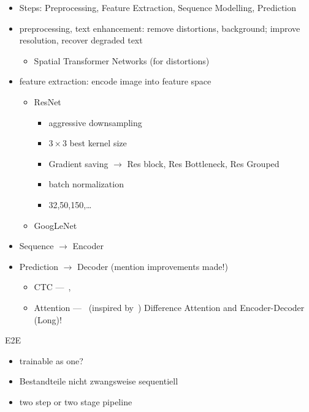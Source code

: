 \begin{itemize}
    \item Steps: Preprocessing, Feature Extraction, Sequence Modelling, Prediction
    \item preprocessing, text enhancement: remove distortions, background; improve resolution,
        recover degraded text
        \begin{itemize}
            \item Spatial Transformer Networks (for distortions)
        \end{itemize}
    \item feature extraction: encode image into feature space
        \begin{itemize}
            \item ResNet
                \begin{itemize}
                    \item aggressive downsampling
                    \item $3\times3$ best kernel size
                    \item Gradient saving $\rightarrow$ Res block, Res Bottleneck, Res Grouped
                    \item batch normalization
                    \item 32,50,150,\ldots
                \end{itemize}
            \item GoogLeNet
        \end{itemize}
    \item Sequence $\rightarrow$ Encoder
    \item Prediction $\rightarrow$ Decoder (mention improvements made!)
        \begin{itemize}
            \item CTC ---~\cite{shi_end--end_2017}, \\
            \item Attention ---~\cite{ghosh_visual_2017} (inspired
                by~\cite{bahdanau_neural_2016,xu_show_2016})
                Difference Attention and Encoder-Decoder (Long)!
        \end{itemize}
\end{itemize}

E2E
\begin{itemize}
    \item trainable as one?
    \item Bestandteile nicht zwangsweise sequentiell
    \item two step or two stage pipeline
\end{itemize}

